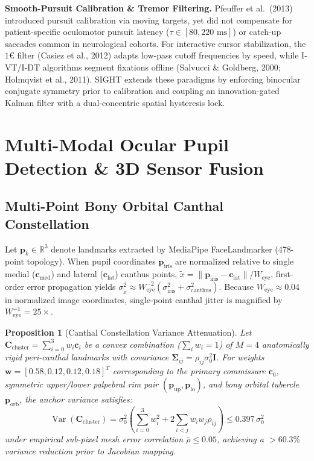 \documentclass[twocolumn,10pt]{article}
\newtheorem{proposition}{Proposition}
\begin{document}
\textbf{Smooth-Pursuit Calibration & Tremor Filtering.} Pfeuffer et al.\ (2013) introduced pursuit calibration via moving targets, yet did not compensate for patient-specific oculomotor pursuit latency ($\tau \in [80, 220\text{ ms}]$) or catch-up saccades common in neurological cohorts. For interactive cursor stabilization, the $1\text{€}$ filter (Casiez et al., 2012) adapts low-pass cutoff frequencies by speed, while I-VT/I-DT algorithms segment fixations offline (Salvucci \& Goldberg, 2000; Holmqvist et al., 2011). SIGHT extends these paradigms by enforcing binocular conjugate symmetry prior to calibration and coupling an innovation-gated Kalman filter with a dual-concentric spatial hysteresis lock.

\section{Multi-Modal Ocular Pupil Detection \& 3D Sensor Fusion}
\label{sec:sensing}

\subsection{Multi-Point Bony Orbital Canthal Constellation}
Let $\mathbf{p}_k \in \mathbb{R}^3$ denote landmarks extracted by MediaPipe FaceLandmarker (478-point topology). When pupil coordinates $\mathbf{p}_{\text{iris}}$ are normalized relative to single medial ($\mathbf{c}_{\text{med}}$) and lateral ($\mathbf{c}_{\text{lat}}$) canthus points, $\tilde{x} = \|\mathbf{p}_{\text{iris}} - \mathbf{c}_{\text{lat}}\| / W_{\text{eye}}$, first-order error propagation yields $\sigma_{\tilde{x}}^2 \approx W_{\text{eye}}^{-2}(\sigma_{\text{iris}}^2 + \sigma_{\text{canthus}}^2)$. Because $W_{\text{eye}} \approx 0.04$ in normalized image coordinates, single-point canthal jitter is magnified by $W_{\text{eye}}^{-1} = 25\times$.

\begin{proposition}[Canthal Constellation Variance Attenuation]
Let $\mathbf{C}_{\text{cluster}} = \sum_{i=0}^{3} w_i \mathbf{c}_i$ be a convex combination ($\sum_i w_i = 1$) of $M=4$ anatomically rigid peri-canthal landmarks with covariance $\mathbf{\Sigma}_{ij} = \rho_{ij}\sigma_0^2 \mathbf{I}$. For weights $\mathbf{w} = [0.58, 0.12, 0.12, 0.18]^T$ corresponding to the primary commissure $\mathbf{c}_0$, symmetric upper/lower palpebral rim pair $(\mathbf{p}_{\text{up}}, \mathbf{p}_{\text{lo}})$, and bony orbital tubercle $\mathbf{p}_{\text{orb}}$, the anchor variance satisfies:
\begin{equation}
\operatorname{Var}(\mathbf{C}_{\text{cluster}}) = \sigma_0^2 \left(\sum_{i=0}^3 w_i^2 + 2\sum_{i<j} w_i w_j \rho_{ij}\right) \le 0.397\,\sigma_0^2
\end{equation}
under empirical sub-pixel mesh error correlation $\bar{\rho} \le 0.05$, achieving a $>60.3\%$ variance reduction prior to Jacobian mapping.
\end{proposition}
\end{document}
